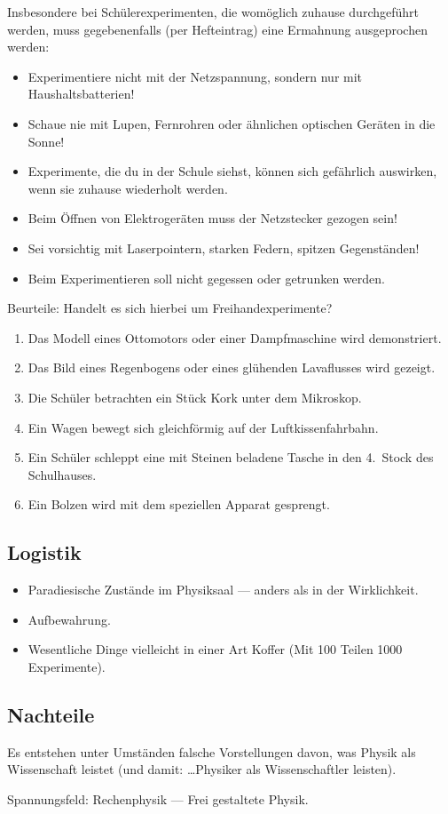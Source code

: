 \begin{itemize}
	\mip
	Insbesondere bei Sch\"{u}lerexperimenten, die wom\"{o}glich zuhause
	durchgef\"{u}hrt werden, muss gegebenenfalls (per Hefteintrag)
	eine Ermahnung ausgeprochen werden:
	\begin{itemize}
		\item
		Experimentiere nicht mit der Netzspannung, sondern nur mit
		Haushaltsbatterien!
		\item
		Schaue nie mit Lupen, Fernrohren oder \"{a}hnlichen optischen
		Ger\"{a}ten in die Sonne!
		\item
		Experimente, die du in der Schule siehst, k\"{o}nnen sich
		gef\"{a}hrlich auswirken, wenn sie zuhause wiederholt werden.
		\item
		Beim \"{O}ffnen von Elektroger\"{a}ten muss der Netzstecker gezogen sein!
		\item
		Sei vorsichtig mit Laserpointern, starken Federn, spitzen
		Gegenst\"{a}nden!
		\item
		Beim Experimentieren soll nicht gegessen oder getrunken werden.
	\end{itemize}

\end{itemize}

\begin{uea}
	Beurteile: Handelt es sich hierbei um Freihandexperimente?
	\begin{enumerate}[label=\alph*.]
			\item
		Das Modell eines Ottomotors oder einer Dampfmaschine
		wird demonstriert.
		\item
		Das Bild eines Regenbogens oder eines gl\"{u}henden Lavaflusses
		wird gezeigt.
		\item
		Die Sch\"{u}ler betrachten ein St\"{u}ck Kork unter dem Mikroskop.
		\item
		Ein Wagen bewegt sich gleichf\"{o}rmig auf der Luftkissenfahrbahn.
		\item
		Ein Sch\"{u}ler schleppt eine mit Steinen beladene Tasche in den
		4.\ Stock des Schulhauses.
		\item
		Ein Bolzen wird mit dem speziellen Apparat gesprengt. 
	\end{enumerate}
\end{uea}

\subsection{Logistik}

\begin{itemize}
	\item Paradiesische Zust\"{a}nde im Physiksaal ---  anders als in der Wirklichkeit.
	\item Aufbewahrung.
	\item Wesentliche Dinge vielleicht in einer Art Koffer (Mit 100 Teilen 1000 Experimente).
\end{itemize}

\subsection{Nachteile}

Es entstehen unter Umst\"{a}nden falsche Vorstellungen davon,
was Physik als Wissenschaft leistet
(und damit: \dots Physiker als Wissenschaftler leisten).

Spannungsfeld: Rechenphysik --- Frei gestaltete Physik.
